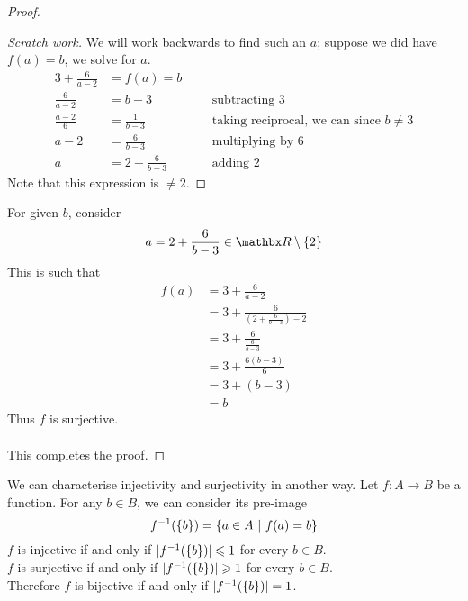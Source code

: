 \begin{proof}
\begin{subproof}
\begin{proof}[Scratch work]\renewcommand{\qed}{}
We will work backwards to find such an $a$; suppose we did have $f(a) = b$, we solve for $a$.
\begin{align*}
3 + \frac{6}{a - 2} &= f(a) = b\\[0.5em]
\frac{6}{a - 2} &= b - 3 &&& \text{subtracting $3$}\\[0.5em]
\frac{a - 2}{6} &= \frac{1}{b - 3} &&& \text{taking reciprocal, we can since $b \neq 3$}\\[0.5em]
a - 2 &= \frac{6}{b - 3} &&& \text{multiplying by $6$}\\[0.5em]
a &= 2 + \frac{6}{b - 3} &&& \text{adding $2$}
\end{align*}
Note that this expression is $\neq 2$.
\end{proof}
\end{subproof}
\vspace*{0.5em}
For given $b$, consider
\[a = 2 + \frac{6}{b - 3} \in \rr\setminus\set{2}\]
This is such that 
\begin{align*}
f(a) &= 3 + \frac{6}{a - 2}\\[1em]
 &= 3 + \frac{6}{\left(2 + \frac{6}{b - 3}\right) - 2}\\[1em]
 &= 3 + \frac{6}{\frac{6}{b - 3}}\\[1em]
 &= 3 + \frac{6(b-3)}{6}\\[1em]
 &= 3 + (b-3)\\[0.5em]
 &= b
\end{align*}
Thus $f$ is surjective.\\
\\
This completes the proof. 
\end{proof}

\vspace*{1em}

\begin{discussion}
We can characterise injectivity and surjectivity in another way. Let $f:A \to B$ be a function. For any $b \in B$, we can consider its pre-image
\[f^{-1}(\left\{b\right\}) = \left\{a \in A\ \vert\ f(a) = b\right\}\]
$f$ is injective if and only if $|f^{-1}(\left\{b\right\})| \leqslant 1$ for every $b \in B$.\\[0.5em]
$f$ is surjective if and only if $|f^{-1}(\left\{b\right\})| \geqslant 1$ for every $b \in B$.\\[0.5em]
Therefore $f$ is bijective if and only if $|f^{-1}(\left\{b\right\})| = 1$.
\end{discussion}

